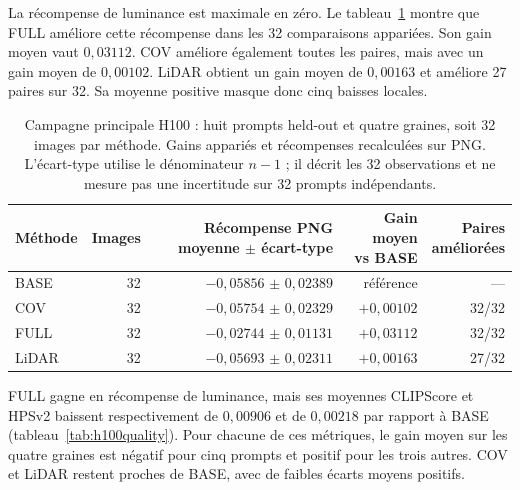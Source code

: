 \documentclass[11pt,a4paper]{article}
\begin{document}
La récompense de luminance est maximale en zéro. Le tableau~\ref{tab:h100reward} montre que FULL améliore cette récompense dans les 32 comparaisons appariées. Son gain moyen vaut $0{,}03112$. COV améliore également toutes les paires, mais avec un gain moyen de $0{,}00102$. LiDAR obtient un gain moyen de $0{,}00163$ et améliore 27 paires sur 32. Sa moyenne positive masque donc cinq baisses locales.

\begin{table}[!htb]
\centering\small
\setlength{\tabcolsep}{5pt}
\begin{tabular}{lrrrr}
\toprule
Méthode & Images & \shortstack{Récompense PNG\\moyenne $\pm$ écart-type} & \shortstack{Gain moyen\\vs BASE} & \shortstack{Paires\\améliorées}\\
\midrule
BASE & 32 & $-0{,}05856$ $\pm$ $0{,}02389$ & référence & ---\\
COV & 32 & $-0{,}05754$ $\pm$ $0{,}02329$ & $+0{,}00102$ & 32/32\\
FULL & 32 & $-0{,}02744$ $\pm$ $0{,}01131$ & $+0{,}03112$ & 32/32\\
LiDAR & 32 & $-0{,}05693$ $\pm$ $0{,}02311$ & $+0{,}00163$ & 27/32\\
\bottomrule
\end{tabular}
\caption{Campagne principale H100 : huit prompts held-out et quatre graines, soit 32 images par méthode. Gains appariés et récompenses recalculées sur PNG. L'écart-type utilise le dénominateur $n-1$ ; il décrit les 32 observations et ne mesure pas une incertitude sur 32 prompts indépendants.}
\label{tab:h100reward}
\end{table}

FULL gagne en récompense de luminance, mais ses moyennes CLIPScore et HPSv2 baissent respectivement de $0{,}00906$ et de $0{,}00218$ par rapport à BASE (tableau~\ref{tab:h100quality}). Pour chacune de ces métriques, le gain moyen sur les quatre graines est négatif pour cinq prompts et positif pour les trois autres. COV et LiDAR restent proches de BASE, avec de faibles écarts moyens positifs.
\end{document}
